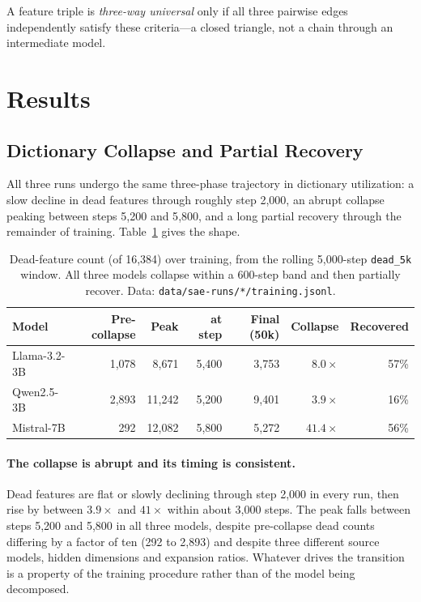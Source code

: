 \documentclass[11pt]{article}
\begin{document}
A feature triple is \emph{three-way universal} only if all three pairwise edges
independently satisfy these criteria---a closed triangle, not a chain through an
intermediate model.

\section{Results}
\label{sec:results}

\subsection{Dictionary Collapse and Partial Recovery}
\label{sec:collapse}

All three runs undergo the same three-phase trajectory in dictionary utilization: a
slow decline in dead features through roughly step 2{,}000, an abrupt collapse peaking
between steps 5{,}200 and 5{,}800, and a long partial recovery through the remainder of
training. Table~\ref{tab:collapse} gives the shape.

\begin{table}[t]
  \centering
  \caption{Dead-feature count (of 16{,}384) over training, from the rolling 5{,}000-step
    \texttt{dead\_5k} window. All three models collapse within a 600-step band and then
    partially recover. Data: \texttt{data/sae-runs/*/training.jsonl}.}
  \label{tab:collapse}
  \smallskip
  \begin{tabular}{lrrrrrr}
    \toprule
    Model & Pre-collapse & Peak & at step & Final (50k) & Collapse & Recovered \\
    \midrule
    Llama-3.2-3B & 1{,}078 &  8{,}671 & 5{,}400 & 3{,}753 & $8.0\times$  & 57\% \\
    Qwen2.5-3B   & 2{,}893 & 11{,}242 & 5{,}200 & 9{,}401 & $3.9\times$  & 16\% \\
    Mistral-7B   &    292  & 12{,}082 & 5{,}800 & 5{,}272 & $41.4\times$ & 56\% \\
    \bottomrule
  \end{tabular}
\end{table}

\paragraph{The collapse is abrupt and its timing is consistent.} Dead features are flat
or slowly declining through step 2{,}000 in every run, then rise by between $3.9\times$
and $41\times$ within about 3{,}000 steps. The peak falls between steps 5{,}200 and
5{,}800 in all three models, despite pre-collapse dead counts differing by a factor of
ten (292 to 2{,}893) and despite three different source models, hidden dimensions and
expansion ratios. Whatever drives the transition is a property of the training
procedure rather than of the model being decomposed.
\end{document}
